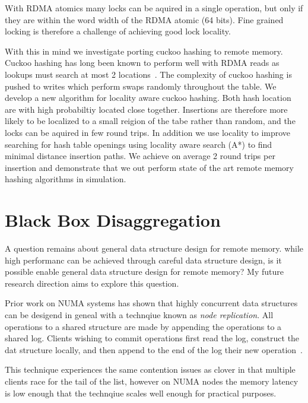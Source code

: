 With RDMA atomics many locks can be aquired in a single
operation, but only if they are within the word width of the
RDMA atomic (64 bits). Fine grained locking is therefore a
challenge of achieving good lock locality.

With this in mind we investigate porting cuckoo hashing to
remote memory. Cuckoo hashing has long been known to perform
well with RDMA reads as lookups must search at most 2
locations~\cite{pilaf, farm}. The complexity of cuckoo
hashing is pushed to writes which perform swaps randomly
throughout the table. We develop a new algorithm for
locality aware cuckoo hashing. Both hash location are with
high probabiltiy located close together. Insertions are
therefore more likely to be localized to a small reigion of
the tabe rather than random, and the locks can be aquired in
few round trips. In addition we use locality to improve
searching for hash table openings using locality aware
search (A*) to find minimal distance insertion paths. We
achieve on average 2 round trips per insertion and
demonstrate that we out perform state of the art remote
memory hashing algorithms in simulation.



\section{Black Box Disaggregation}

A question remains about general data structure design for
remote memory. while high performanc can be achieved through
careful data structure design, is it possible enable general
data structure design for remote memory? My future research
direction aims to explore this question.

Prior work on NUMA systems has shown that highly concurrent
data structures can be desigend in geneal with a technqiue
known as \textit{node replication}. All operations to a
shared structure are made by appending the operations to a
shared log. Clients wishing to commit operations first read
the log, construct the dat structure locally, and then
append to the end of the log their new operation~\cite{bbd}.

This technique experiences the same contention issues as
clover in that multiple clients race for the tail of the
list, however on NUMA nodes the memory latency is low enough
that the technqiue scales well enough for practical
purposes. 

